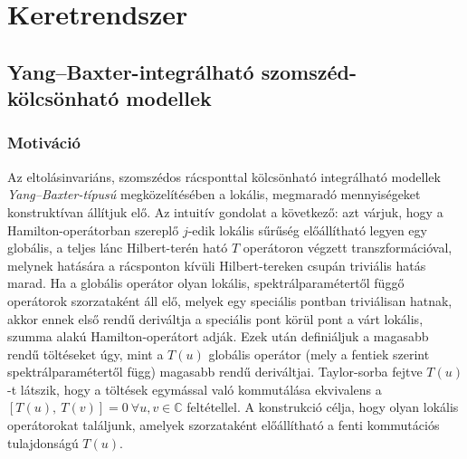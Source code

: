 \documentclass[12pt,a4paper,oneside]{report}
\begin{document}
\chapter{Keretrendszer}

\section{Yang--Baxter-integrálható szomszéd-kölcsönható modellek}
\subsection{Motiváció}
Az eltolásinvariáns, szomszédos rácsponttal kölcsönható integrálható modellek \textit{Yang--Baxter-típusú} megközelítésében a lokális, megmaradó mennyiségeket konstruktívan állítjuk elő. Az intuitív gondolat a következő: azt várjuk, hogy a Hamilton-operátorban szereplő $j$-edik lokális sűrűség előállítható legyen egy globális, a teljes lánc Hilbert-terén ható $T$ operátoron végzett transzformációval, melynek hatására a rácsponton kívüli Hilbert-tereken csupán triviális hatás marad. Ha a globális operátor olyan lokális, spektrálparamétertől függő operátorok szorzataként áll elő, melyek egy speciális pontban triviálisan hatnak, akkor ennek első rendű deriváltja a speciális pont körül pont a várt lokális, szumma alakú Hamilton-operátort adják. Ezek után definiáljuk a magasabb rendű töltéseket úgy, mint a $T(u)$ globális operátor (mely a fentiek szerint spektrálparamétertől függ) magasabb rendű deriváltjai. Taylor-sorba fejtve $T(u)$-t látszik, hogy a töltések egymással való kommutálása ekvivalens a $[T(u),\ T(v)]=0\ \forall u,v\in\mathbb{C}$ feltétellel. A konstrukció célja, hogy olyan lokális operátorokat találjunk, amelyek szorzataként előállítható a fenti kommutációs tulajdonságú $T(u)$.\\
\end{document}
